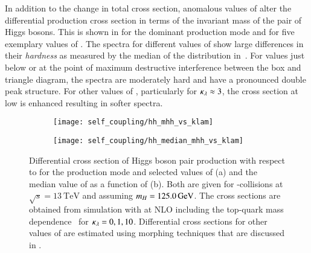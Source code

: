 In addition to the change in total cross section, anomalous values of
\klambda alter the differential \HH production cross section in terms
of the invariant mass of the pair of Higgs bosons. This is shown in
 for the dominant \ggF production mode and for
five exemplary values of \klambda. The \mHH spectra for different
values of \klambda show large differences in their \emph{hardness} as
measured by the median of the \mHH distribution
in~. For \klambda values just below or at the
point of maximum destructive interference between the box and triangle
diagram, the \mHH spectra are moderately hard and have a pronounced
double peak structure. For other values of \klambda, particularly for
$\kappa_{\lambda} \approx 3$, the cross section at low \mHH is enhanced
resulting in softer \mHH spectra.

\begin{figure}[htbp]
  \begin{subfigure}[t]{0.485\textwidth}
    \texttt{[image: self\_coupling/hh\_mhh\_vs\_klam]}
    \subcaption{%
    }%
    \label{fig:hh_xsec_mhh}
  \end{subfigure}\hfill%
  \begin{subfigure}[t]{0.485\textwidth}
    \texttt{[image: self\_coupling/hh\_median\_mhh\_vs\_klam]}
    \subcaption{%
    }%
    \label{fig:hh_median_mhh}
  \end{subfigure}

  \caption{Differential cross section of Higgs boson pair production
    with respect to \mHH for the \ggF production mode and selected
    values of \klambda (a) and the median value of \mHH as a function
    of \klambda (b). Both are given for \pp-collisions at
    $\sqrt{s} = \SI{13}{\TeV}$ and assuming $m_{H} =
    \SI{125.0}{\ensuremath{\text{GeV}}}$. The cross sections are obtained from simulation
    with \POWHEGBOX[v2] at NLO including the top-quark mass
    dependence~\cite{Heinrich:2019bkc,Heinrich:2020ckp} for
    $\kappa_{\lambda} = 0, 1, 10$. Differential cross sections for other
    values of \klambda are estimated using morphing techniques that
    are discussed in .}
\end{figure}


